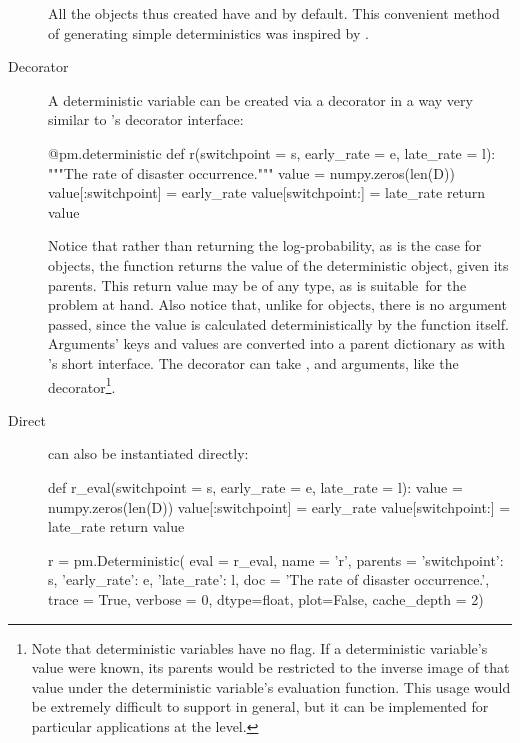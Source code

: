 \documentclass[]{jss}
\begin{document}
\begin{description}
All the objects thus created have  and  by default. This convenient method of generating simple deterministics was inspired by \citet{fbc}.

    \item[Decorator] A deterministic variable can be created via a decorator in a way very similar to 's decorator interface:
\begin{CodeInput}
@pm.deterministic
def r(switchpoint = s, early_rate = e, late_rate = l):
"""The rate of disaster occurrence."""
value = numpy.zeros(len(D))
value[:switchpoint] = early_rate
value[switchpoint:] = late_rate
return value
\end{CodeInput}
Notice that rather than returning the log-probability, as is the case for  objects, the function returns the value of the deterministic object, given its parents. This return value may be of any type, as is suitable~for the problem at hand. Also notice that, unlike for  objects, there is no  argument passed, since the value is calculated deterministically by the function itself. Arguments' keys and values are converted into a parent dictionary as with 's short interface. The  decorator can take ,  and  arguments, like the  decorator\footnote{Note that deterministic variables have no  flag. If a deterministic variable's value were known, its parents would be restricted to the inverse image of that value under the deterministic variable's evaluation function. This usage would be extremely difficult to support in general, but it can be implemented for particular applications at the  level.}.

    \item[Direct]  can also be instantiated directly:
\begin{CodeInput}
def r_eval(switchpoint = s, early_rate = e, late_rate = l):
value = numpy.zeros(len(D))
value[:switchpoint] = early_rate
value[switchpoint:] = late_rate
return value

r = pm.Deterministic(  eval = r_eval,
                name = 'r',
                parents = {'switchpoint': s, 'early_rate': e, 'late_rate': l},
                doc = 'The rate of disaster occurrence.',
                trace = True,
                verbose = 0,
                dtype=float,
                plot=False,
                cache_depth = 2)
\end{CodeInput}
\end{description}
\end{document}
